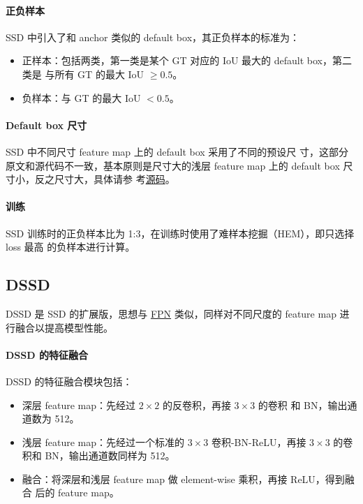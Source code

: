 \paragraph{正负样本}
SSD 中引入了和 anchor 类似的 default box，其正负样本的标准为：

\begin{itemize}
  \item 正样本：包括两类，第一类是某个 GT 对应的 IoU 最大的 default box，第二类是
    与所有 GT 的最大 IoU $ \geq 0.5 $。
  \item 负样本：与 GT 的最大 IoU $ < 0.5 $。
\end{itemize}

\paragraph{Default box 尺寸}
SSD 中不同尺寸 feature map 上的 default box 采用了不同的预设尺
寸，这部分原文和源代码不一致，基本原则是尺寸大的浅层 feature map 上的 default
box 尺寸小，反之尺寸大，具体请参
考\href{https://github.com/weiliu89/caffe/blob/ssd/examples/ssd/ssd_pascal.py}{源码}。

\paragraph{训练}
SSD 训练时的正负样本比为 1:3，在训练时使用了难样本挖掘（HEM），即只选择 loss 最高
的负样本进行计算。

\subsection{DSSD}
\label{subsec:DSSD}

DSSD 是 SSD 的扩展版，思想与 \hyperref[sec:FPN]{FPN} 类似，同样对不同尺度的
feature map 进行融合以提高模型性能。

\paragraph{DSSD 的特征融合}
DSSD 的特征融合模块包括：

\begin{itemize}
  \item 深层 feature map：先经过 $2 \times 2$ 的反卷积，再接 $3 \times 3$ 的卷积
    和 BN，输出通道数为 512。
  \item 浅层 feature map：先经过一个标准的 $3 \times 3$ 卷积-BN-ReLU，再接 $3
    \times 3$ 的卷积和 BN，输出通道数同样为 512。
  \item 融合：将深层和浅层 feature map 做 element-wise 乘积，再接 ReLU，得到融合
    后的 feature map。
\end{itemize}


